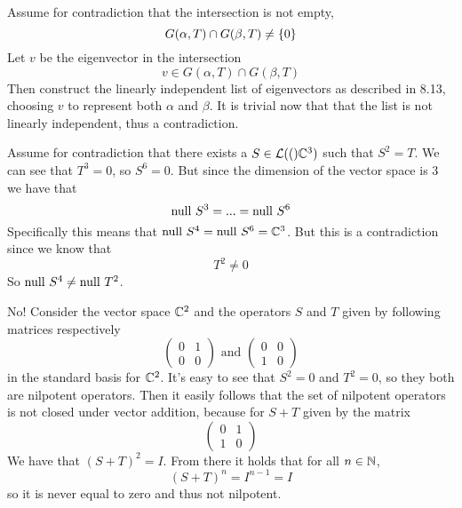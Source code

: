 \documentclass[10pt, twocolumn]{article}
\begin{document}
\begin{q}[4]
    Assume for contradiction that the intersection is not empty, 
    $$ G(\alpha, T) \cap G(\beta, T) \neq \{0\} $$
    Let $ v $ be the eigenvector in the intersection
    $$ v \in G(\alpha, T) \cap G(\beta, T) $$
    Then construct the linearly independent list of eigenvectors as described in 8.13, choosing $ v $ to represent both $ \alpha $ and $ \beta $. 
    It is trivial now that that the list is not linearly independent, thus a contradiction.
\end{q}

\begin{q}[6]
    Assume for contradiction that there exists a $ S \in \mathcal{L}(()\mathbb{C}^3) $
    such that $ S^2 = T $. 
    We can see that $ T^3 = 0 $, so $ S^6 = 0 $. 
    But since the dimension of the vector space is 3 we have that
    $$ \text{null } S^3 = ... = \text{null } S^6 $$
    Specifically this means that $ \text{null } S^4 = \text{null } S^6 = \mathbb{C}^3 $. 
    But this is a contradiction since we know that 
    $$ T^2 \neq 0 $$
    So $ \text{null } S^4 \neq \text{null } T^2 $. 
\end{q}

\begin{q}[8]
    No! Consider the vector space $ \mathbb{C}^2 $ 
    and the operators $ S $ and $ T $ given by following matrices respectively
    $$ 
        \left(
            \begin{array}{cc}
                0 & 1 \\
                0 & 0 
            \end{array}
        \right)
        \text{ and }
        \left(
            \begin{array}{cc}
                0 & 0 \\
                1 & 0 
            \end{array}
        \right)
    $$
    in the standard basis for $ \mathbb{C}^2 $.
    It's easy to see that $ S^2 = 0 $ and $ T^2 = 0 $, so they both are nilpotent operators.
    Then it easily follows that the set of nilpotent operators is not closed under vector addition, 
    because for $ S + T $ given by the matrix
    $$
        \left(
            \begin{array}{cc}
                0 & 1 \\
                1 & 0 
            \end{array}
        \right)
    $$
    We have that $ (S + T)^2 = I $. 
    From there it holds that for all $ n \in \mathbb{N} $, 
    $$ (S + T)^n = I^{n - 1} = I $$
    so it is never equal to zero and thus not nilpotent.
\end{q}
\end{document}
